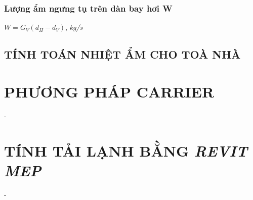 \subsubsection{Lượng ẩm ngưng tụ trên dàn bay hơi W}
\begin{center}
	$W = G_{V}(d_{H}-d_{V})$, \textit{kg/s}
\end{center}

\subsection{TÍNH TOÁN NHIỆT ẨM CHO TOÀ NHÀ}




\section{PHƯƠNG PHÁP CARRIER}
\hspace{1cm}- 

\section{TÍNH TẢI LẠNH BẰNG \emph{REVIT MEP}}
\hspace{1cm}- 


